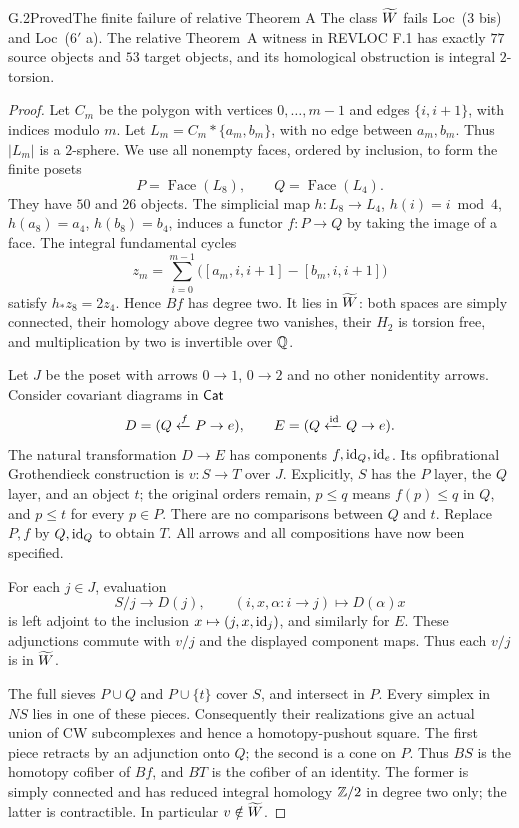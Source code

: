 \begin{claim}{G.2}{Proved}{The finite failure of relative Theorem A}
\label{G:finite-relative}
The class $\widetilde W$ fails Loc~(3 bis) and Loc~($6'$ a).  The relative
Theorem~A witness in REVLOC F.1 has exactly $77$ source objects and
$53$ target objects, and its homological obstruction is integral
$2$-torsion.
\end{claim}
\begin{proof}
Let $C_m$ be the polygon with vertices $0,\ldots,m-1$ and edges
$\{i,i+1\}$, with indices modulo $m$.  Let
$L_m=C_m*\{a_m,b_m\}$, with no edge between $a_m,b_m$.  Thus $|L_m|$
is a $2$-sphere.  We use all nonempty faces, ordered by inclusion, to
form the finite posets
\[
 P=\operatorname{Face}(L_8),\qquad
 Q=\operatorname{Face}(L_4).
\]
They have $50$ and $26$ objects.  The simplicial map
$h:L_8\to L_4$, $h(i)=i\bmod4$, $h(a_8)=a_4$, $h(b_8)=b_4$,
induces a functor $f:P\to Q$ by taking the image of a face.  The
integral fundamental cycles
\[
 z_m=\sum_{i=0}^{m-1}
 \bigl([a_m,i,i+1]-[b_m,i,i+1]\bigr)
\]
satisfy $h_*z_8=2z_4$.  Hence $Bf$ has degree two.  It lies in
$\widetilde W$: both spaces are simply connected, their homology above degree
two vanishes, their $H_2$ is torsion free, and multiplication by two is
invertible over $\mathbb Q$.

Let $J$ be the poset with arrows $0\to1$, $0\to2$ and no other
nonidentity arrows.  Consider covariant diagrams in $\mathsf{Cat}$
\[
 D=(Q\xleftarrow{f}P\to e),\qquad
 E=(Q\xleftarrow{\mathrm{id}}Q\to e).
\]
The natural transformation $D\to E$ has components $f,\mathrm{id}_Q,\mathrm{id}_e$.
Its opfibrational Grothendieck construction is $v:S\to T$ over $J$.
Explicitly, $S$ has the $P$ layer, the $Q$ layer, and an object $t$;
the original orders remain, $p\leq q$ means $f(p)\leq q$ in $Q$,
and $p\leq t$ for every $p\in P$.  There are no comparisons between
$Q$ and $t$.  Replace $P,f$ by $Q,\mathrm{id}_Q$ to obtain $T$.  All arrows
and all compositions have now been specified.

For each $j\in J$, evaluation
\[
 S/j\longrightarrow D(j),\qquad(i,x,\alpha:i\to j)
 \longmapsto D(\alpha)x
\]
is left adjoint to the inclusion $x\mapsto(j,x,\mathrm{id}_j)$, and similarly
for $E$.  These adjunctions commute with $v/j$ and the displayed
component maps.  Thus each $v/j$ is in $\widetilde W$.

The full sieves $P\cup Q$ and $P\cup\{t\}$ cover $S$, and intersect
in $P$.  Every simplex in $NS$ lies in one of these pieces.  Consequently
their realizations give an actual union of CW subcomplexes and hence a
homotopy-pushout square.  The first piece retracts by an adjunction onto
$Q$; the second is a cone on $P$.  Thus $BS$ is the homotopy cofiber
of $Bf$, and $BT$ is the cofiber of an identity.  The former is simply
connected and has reduced integral homology $\mathbb Z/2$ in degree two only;
the latter is contractible.  In particular $v\notin\widetilde W$.


\end{proof}
